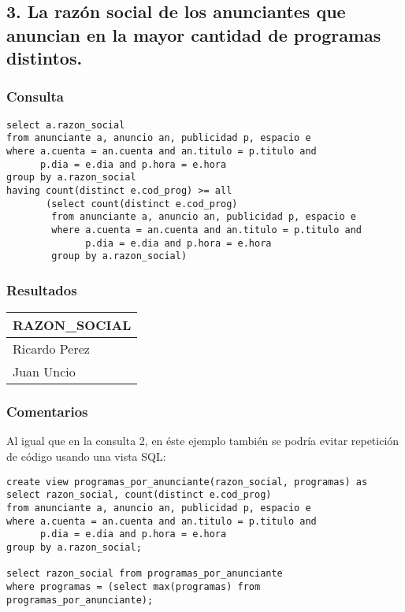\subsection*{3. \normalsize{La raz\'on social de los anunciantes que anuncian en la mayor cantidad de programas distintos.}}

\subsubsection*{Consulta}
\begin{lstlisting} 
select a.razon_social
from anunciante a, anuncio an, publicidad p, espacio e
where a.cuenta = an.cuenta and an.titulo = p.titulo and 
      p.dia = e.dia and p.hora = e.hora
group by a.razon_social
having count(distinct e.cod_prog) >= all 
       (select count(distinct e.cod_prog)
        from anunciante a, anuncio an, publicidad p, espacio e
        where a.cuenta = an.cuenta and an.titulo = p.titulo and 
              p.dia = e.dia and p.hora = e.hora
        group by a.razon_social)
\end{lstlisting}

\subsubsection*{Resultados}
\begin{tabular}{|l|}
  \hline
    \bf{RAZON\_SOCIAL} \\ 
  \hline
    Ricardo Perez \\
    Juan Uncio \\ 
  \hline
\end{tabular} 

\subsubsection*{Comentarios}
Al igual que en la consulta 2, en \'este ejemplo tambi\'en se podr\'ia evitar repetici\'on de c\'odigo usando una vista SQL:

\begin{lstlisting} 
create view programas_por_anunciante(razon_social, programas) as
select razon_social, count(distinct e.cod_prog)
from anunciante a, anuncio an, publicidad p, espacio e
where a.cuenta = an.cuenta and an.titulo = p.titulo and 
      p.dia = e.dia and p.hora = e.hora
group by a.razon_social;

select razon_social from programas_por_anunciante
where programas = (select max(programas) from programas_por_anunciante);

\end{lstlisting}

